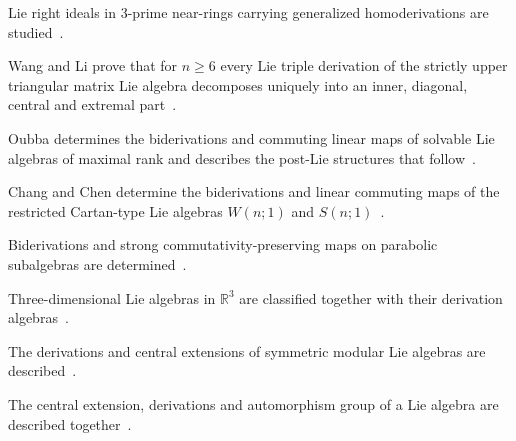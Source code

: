 Lie right ideals in 3-prime near-rings carrying generalized homoderivations
are studied~\cite{WlLieRightIdealsIn3PrimeNearRing2020}.

Wang and Li prove that for $n\geq 6$ every Lie triple derivation of the
strictly upper triangular matrix Lie algebra decomposes uniquely into an
inner, diagonal, central and extremal
part~\cite{WlLieTripleDerivationOfTheLieAlg2020}.

Oubba determines the biderivations and commuting linear maps of solvable Lie
algebras of maximal rank and describes the post-Lie structures that
follow~\cite{WlBiderivationsCommutingLinearMa2020}.

Chang and Chen determine the biderivations and linear commuting maps of the
restricted Cartan-type Lie algebras $W(n;1)$ and
$S(n;1)$~\cite{WlBiderivationsAndLinearCommutin2020}.

Biderivations and strong commutativity-preserving maps on parabolic
subalgebras are determined~\cite{WlBiderivationsAndStrongCommutat2020}.

Three-dimensional Lie algebras in $\mathbb{R}^3$ are classified together with
their derivation algebras~\cite{WlClassificationOfThreeDimension2020}.

The derivations and central extensions of symmetric modular Lie algebras are
described~\cite{WlDerivationsAndCentralExtension2020}.

The central extension, derivations and automorphism group of a Lie algebra are
described together~\cite{WlCentralExtensionDerivationsAnd2020}.
